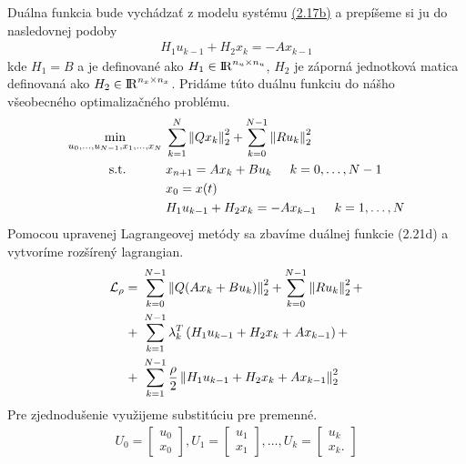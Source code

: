 Duálna funkcia bude vychádzať z modelu systému \hyperref[math:2.17]{(2.17b)} a prepíšeme si ju do nasledovnej podoby
\begin{align}
	H_{1}u_{k-1} + H_{2}x_{k} = -Ax_{k-1}
\end{align}
kde $H_{1} = B$ a je definované ako $H_{1} \in {\rm I\!R}^{n_{u}\times n_{u}}$, $H_{2}$ je záporná jednotková matica definovaná ako $H_{2} \in {\rm I\!R}^{n_{x}\times n_{x}}$. Pridáme túto duálnu funkciu do nášho všeobecného optimalizačného problému.
\begin{subequations}
	\begin{align}
		\displaystyle \min_{u_0,...,u_{N-1},x_1,...,x_N} \hspace{0.1cm} & 
		\sum_{k=1}^{N}
		\left\lVert Qx_k\right\rVert^{2}_{2}+\sum_{k=0}^{N-1}\left\lVert Ru_k\right\rVert^{2}_{2}\\
		\textrm{s.t.} \hspace{1.1cm} & x_{n+1} = Ax_{k}+Bu_{k} \hspace{0.5cm} k=0,\dots,N-1\\
		& x_{0} = x(t)\\
		&H_{1}u_{k-1} + H_{2}x_{k} = -Ax_{k-1}\hspace{0.5cm} k=1,\dots,N
	\end{align}
\end{subequations}
Pomocou upravenej Lagrangeovej metódy sa zbavíme duálnej funkcie (2.21d) a vytvoríme rozšírený lagrangian.
\label{math:RozsirenyLag}
\begin{equation}
\begin{split}
\mathcal{L}_{\rho} =&~ \sum_{k=0}^{N-1}\left\lVert Q(Ax_{k}+Bu_{k})\right\rVert^{2}_{2}+\sum_{k=0}^{N-1}\left\lVert Ru_k\right\rVert^{2}_{2} +\\+&~\sum_{k=1}^{N-1}\lambda_{k}^{T}\left(  H_{1}u_{k-1} + H_{2}x_{k} + Ax_{k-1}\right) +\\+&~\sum_{k=1}^{N-1}\frac{\rho}{2} \left\lVert H_{1}u_{k-1} + H_{2}x_{k} + Ax_{k-1}\right\rVert_{2}^{2}
\end{split}
\end{equation}
Pre zjednodušenie využijeme substitúciu pre premenné.
\begin{align}
	U_{0} =\begin{bmatrix}
	u_{0}\\
	x_{0}
	\end{bmatrix},
	U_{1} =\begin{bmatrix}
	u_{1}\\
	x_{1}
	\end{bmatrix}, \dots ,
	U_{k} =\begin{bmatrix}
	u_{k}\\
	x_{k}.
	\end{bmatrix}
\end{align}
